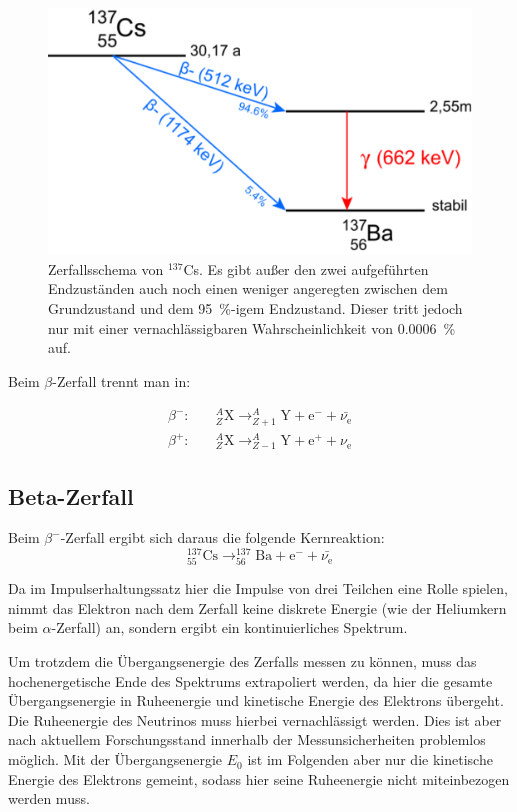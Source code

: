 \documentclass[
	a4paper,
	12pt,
	pagesize,
	ngerman
]{scrartcl}
\begin{document}
	\begin{figure}[H]
			\includegraphics[width= 0.6 \linewidth]{img/cs-137-zerfallsschema}
			\caption{
			Zerfallsschema von $^{137}$Cs.
			Es gibt außer den zwei aufgeführten Endzuständen auch noch einen weniger angeregten zwischen dem Grundzustand und dem \SI{95}{\percent}-igem Endzustand.
			Dieser tritt jedoch nur mit einer vernachlässigbaren Wahrscheinlichkeit von \SI{0.0006}{\percent} auf.
			\cite{Leifi}
			}
			\label{fig_Zerfallsschema}
	\end{figure}

	Beim $\beta$-Zerfall trennt man in: %

	\begin{align}
		\beta^-: \quad & _{Z}^{A}\text{X} \rightarrow _{Z+1}^{A}\text{Y} + \text{e}^- + \bar{\nu_{\text{e}}}\\
		\beta^+: \quad & _{Z}^{A}\text{X} \rightarrow _{Z-1}^{A}\text{Y} + \text{e}^+ + \nu_{\text{e}}
	\end{align}

		\subsection{Beta-Zerfall}

		Beim $\beta^-$-Zerfall ergibt sich daraus die folgende Kernreaktion:
		\begin{equation}
			\label{eq_beta-minus}
			 _{55}^{137}\text{Cs} \rightarrow _{56}^{137}\text{Ba} + \text{e}^- + \bar{\nu_{\text{e}}}
		\end{equation}

		Da im Impulserhaltungssatz hier die Impulse von drei Teilchen eine Rolle spielen, nimmt das Elektron nach dem Zerfall keine diskrete Energie (wie der Heliumkern beim $\alpha$-Zerfall) an, sondern ergibt ein kontinuierliches Spektrum.

		Um trotzdem die Übergangsenergie des Zerfalls messen zu können, muss das hochenergetische Ende des Spektrums extrapoliert werden, da hier die gesamte Übergangsenergie in Ruheenergie und kinetische Energie des Elektrons übergeht.
		Die Ruheenergie des Neutrinos muss hierbei vernachlässigt werden.
		Dies ist aber nach aktuellem Forschungsstand innerhalb der Messunsicherheiten problemlos möglich.
		Mit der Übergangsenergie $E_0$ ist im Folgenden aber nur die kinetische Energie des Elektrons gemeint, sodass hier seine Ruheenergie nicht miteinbezogen werden muss.
\end{document}
